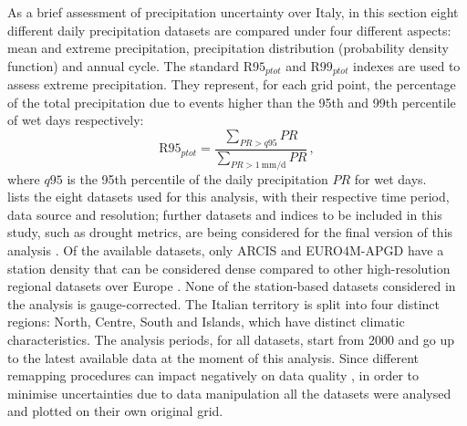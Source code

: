 As a brief assessment of precipitation uncertainty over Italy, in this section eight different daily precipitation datasets are compared under four different aspects: mean and extreme precipitation, precipitation distribution (probability density function) and annual cycle.
The standard $\textrm{R95}_{ptot}$ and $\textrm{R99}_{ptot}$ indexes are used to assess extreme precipitation.
They represent, for each grid point, the percentage of the total precipitation due to events higher than the 95th and 99th percentile of wet days respectively:
\begin{equation}
    \textrm{R95}_{ptot} = \frac{\sum_{PR > q95} PR}{\sum_{PR > \SI{1}{\milli\metre\per\day}} PR}\,,
\end{equation}\label{eq:r95}
where $q95$ is the 95th percentile of the daily precipitation $PR$ for wet days.\\
 lists the eight datasets used for this analysis, with their respective time period, data source and resolution; further datasets and indices to be included in this study, such as drought metrics, are being considered for the final version of this analysis \citep[][in preparation]{Fantini2018}.
Of the available datasets, only ARCIS and EURO4M-APGD have a station density that can be considered dense compared to other high-resolution regional datasets over Europe \citep[see][]{Prein2017, Fantini2016}. None of the station-based datasets considered in the analysis is gauge-corrected.
The Italian territory is split into four distinct regions: North, Centre, South and Islands, which have distinct climatic characteristics.
The analysis periods, for all datasets, start from 2000 and go up to the latest available data at the moment of this analysis.
Since different remapping procedures can impact negatively on data quality \citep{Diaconescu2015}, in order to minimise uncertainties due to data manipulation all the datasets were analysed and plotted on their own original grid.
